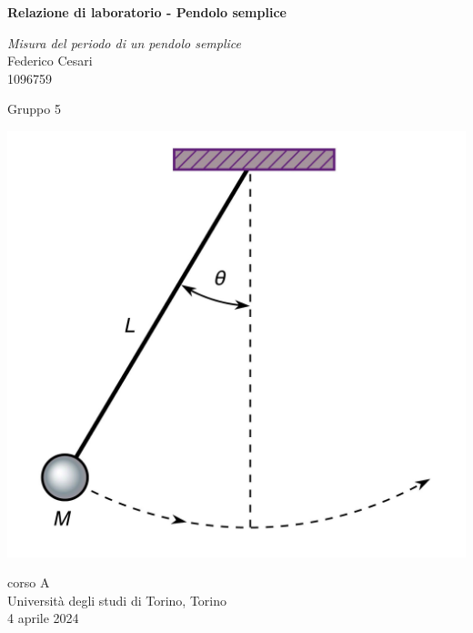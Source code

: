 \begin{titlepage}
	\begin{center}
		\vspace*{1cm}
		
		\textbf{\LARGE Relazione di laboratorio - Pendolo semplice}
		
		\vspace{0.3cm}
		\large \textit{Misura del periodo di un pendolo semplice} \\
		
		\vspace{0.5cm}
		\Large Federico Cesari \\
		
		\small 1096759 
		\vspace{0.2cm}
		
		\small Gruppo 5
		
		
		\vspace{3cm}
		\begin{center}
			\includegraphics[scale=0.1]{IMG_0200.jpeg}	
		\end{center}
		
		
		
		\vfill
		
		
		
		corso A\\
		Università degli studi di Torino, Torino\\
		4 aprile 2024\\
		
		
	\end{center}
\end{titlepage}
